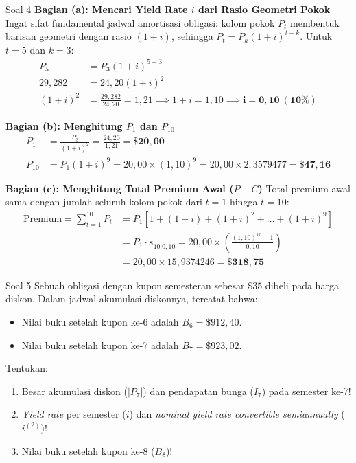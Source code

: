 \documentclass[11pt,a4paper]{article}
\begin{document}
\begin{solutionbox}{Soal 4}
\textbf{Bagian (a): Mencari Yield Rate $i$ dari Rasio Geometri Pokok}
Ingat sifat fundamental jadwal amortisasi obligasi: kolom pokok $P_t$ membentuk barisan geometri dengan rasio $(1+i)$, sehingga $P_t = P_k(1+i)^{t-k}$. Untuk $t = 5$ dan $k = 3$:
\begin{align*}
    P_5 &= P_3 (1 + i)^{5-3} \\[0.3em]
    29{,}282 &= 24{,}20 (1 + i)^2 \\[0.3em]
    (1 + i)^2 &= \frac{29{,}282}{24{,}20} = 1{,}21 \implies 1 + i = 1{,}10 \implies \mathbf{i = 0{,}10 \ (10\%)}
\end{align*}

\textbf{Bagian (b): Menghitung $P_1$ dan $P_{10}$}
\begin{align*}
    P_1 &= \frac{P_3}{(1 + i)^2} = \frac{24{,}20}{1{,}21} = \mathbf{\$20{,}00} \\[0.3em]
    P_{10} &= P_1 (1 + i)^9 = 20{,}00 \times (1{,}10)^9 = 20{,}00 \times 2{,}3579477 = \mathbf{\$47{,}16}
\end{align*}

\textbf{Bagian (c): Menghitung Total Premium Awal ($P - C$)}
Total premium awal sama dengan jumlah seluruh kolom pokok dari $t = 1$ hingga $t = 10$:
\begin{align*}
    \text{Premium} = \sum_{t=1}^{10} P_t &= P_1 \left[ 1 + (1+i) + (1+i)^2 + \dots + (1+i)^9 \right] \\[0.3em]
    &= P_1 \cdot s_{\overline{10}|0{,}10} = 20{,}00 \times \left( \frac{(1{,}10)^{10} - 1}{0{,}10} \right) \\[0.3em]
    &= 20{,}00 \times 15{,}9374246 = \mathbf{\$318{,}75}
\end{align*}
\end{solutionbox}

\vspace{1.2em}

\begin{problembox}{Soal 5}
Sebuah obligasi dengan kupon semesteran sebesar $\$35$ dibeli pada harga diskon. Dalam jadwal akumulasi diskonnya, tercatat bahwa:
\begin{itemize}
    \item Nilai buku setelah kupon ke-6 adalah $B_6 = \$912{,}40$.
    \item Nilai buku setelah kupon ke-7 adalah $B_7 = \$923{,}02$.
\end{itemize}
Tentukan:
\begin{enumerate}[label=(\alph*)]
    \item Besar akumulasi diskon ($|P_7|$) dan pendapatan bunga ($I_7$) pada semester ke-7!
    \item \textit{Yield rate} per semester ($i$) dan \textit{nominal yield rate convertible semiannually} ($i^{(2)}$)!
    \item Nilai buku setelah kupon ke-8 ($B_8$)!
\end{enumerate}
\end{problembox}
\end{document}
